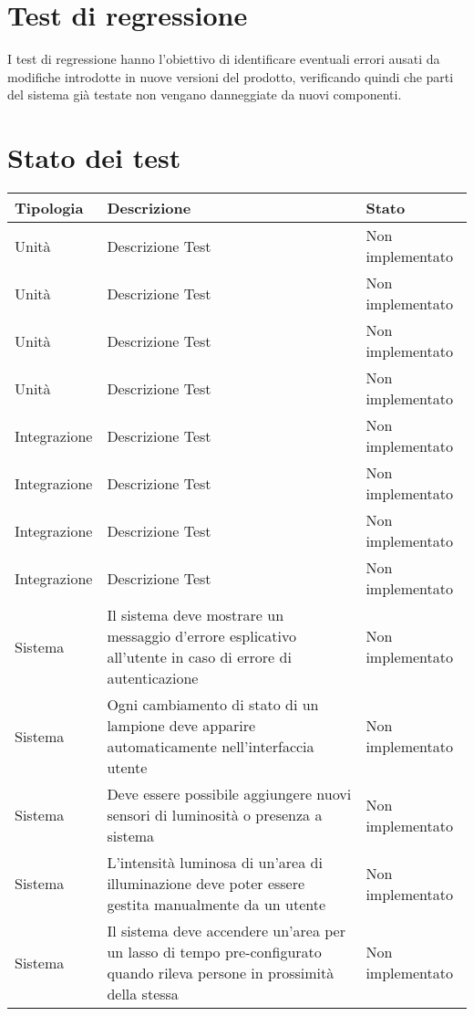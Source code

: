 \section{Test di regressione}
I test di regressione hanno l'obiettivo di identificare eventuali errori ausati da modifiche introdotte in nuove versioni del prodotto, verificando quindi che parti del sistema già testate non vengano danneggiate da nuovi componenti.

\section{Stato dei test}

\begin{center}
    \begin{xltabular}{\linewidth}{|l|X|l|}
        \hline
        \textbf{Tipologia} & \textbf{Descrizione} & \textbf{Stato}\\
        \hline
        Unità & Descrizione Test & Non implementato\\
        Unità & Descrizione Test & Non implementato\\
        Unità & Descrizione Test & Non implementato\\
        Unità & Descrizione Test & Non implementato\\
        \hline
        Integrazione & Descrizione Test & Non implementato\\
        Integrazione & Descrizione Test & Non implementato\\
        Integrazione & Descrizione Test & Non implementato\\
        Integrazione & Descrizione Test & Non implementato\\
        \hline
        Sistema & Il sistema deve mostrare un messaggio d'errore esplicativo all'utente in caso di errore di autenticazione & Non implementato\\
        Sistema & Ogni cambiamento di stato di un lampione deve apparire automaticamente nell'interfaccia utente & Non implementato\\
        Sistema & Deve essere possibile aggiungere nuovi sensori di luminosità o presenza a sistema & Non implementato\\
        Sistema & L'intensità luminosa di un'area di illuminazione deve poter essere gestita manualmente da un utente & Non implementato\\
        Sistema & Il sistema deve accendere un'area per un lasso di tempo pre-configurato quando rileva persone in prossimità della stessa & Non implementato\\

\end{xltabular}
\end{center}
